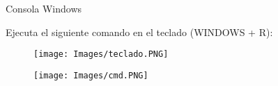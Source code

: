 \begin{frame}[t]{Consola Windows}\vspace{10pt}

Ejecuta el siguiente comando en el teclado (WINDOWS + R):

\begin{figure}
	\texttt{[image: Images/teclado.PNG]}
\end{figure}

\begin{figure}
	\texttt{[image: Images/cmd.PNG]}
\end{figure}


\end{frame}